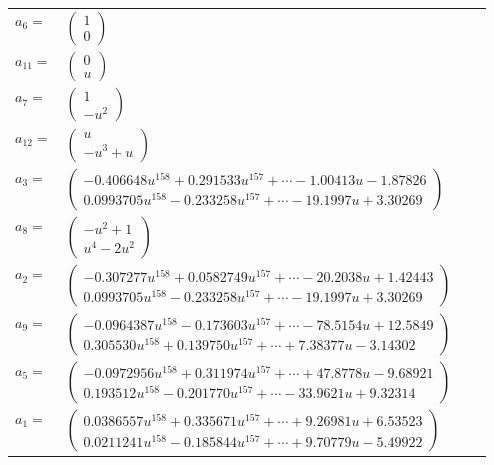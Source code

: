 \documentclass[1p]{elsarticle_modified}
\theoremstyle{definition}
\begin{document}
\begin{tabular}{m{7pt} m{180pt} m{7pt} m{180pt} }
\flushright $a_{6}=$&$\begin{pmatrix}1\\0\end{pmatrix}$ \\
\flushright $a_{11}=$&$\begin{pmatrix}0\\u\end{pmatrix}$ \\
\flushright $a_{7}=$&$\begin{pmatrix}1\\- u^2\end{pmatrix}$ \\
\flushright $a_{12}=$&$\begin{pmatrix}u\\- u^3+u\end{pmatrix}$ \\
\flushright $a_{3}=$&$\begin{pmatrix}-0.406648 u^{158}+0.291533 u^{157}+\cdots-1.00413 u-1.87826\\0.0993705 u^{158}-0.233258 u^{157}+\cdots-19.1997 u+3.30269\end{pmatrix}$ \\
\flushright $a_{8}=$&$\begin{pmatrix}- u^2+1\\u^4-2 u^2\end{pmatrix}$ \\
\flushright $a_{2}=$&$\begin{pmatrix}-0.307277 u^{158}+0.0582749 u^{157}+\cdots-20.2038 u+1.42443\\0.0993705 u^{158}-0.233258 u^{157}+\cdots-19.1997 u+3.30269\end{pmatrix}$ \\
\flushright $a_{9}=$&$\begin{pmatrix}-0.0964387 u^{158}-0.173603 u^{157}+\cdots-78.5154 u+12.5849\\0.305530 u^{158}+0.139750 u^{157}+\cdots+7.38377 u-3.14302\end{pmatrix}$ \\
\flushright $a_{5}=$&$\begin{pmatrix}-0.0972956 u^{158}+0.311974 u^{157}+\cdots+47.8778 u-9.68921\\0.193512 u^{158}-0.201770 u^{157}+\cdots-33.9621 u+9.32314\end{pmatrix}$ \\
\flushright $a_{1}=$&$\begin{pmatrix}0.0386557 u^{158}+0.335671 u^{157}+\cdots+9.26981 u+6.53523\\0.0211241 u^{158}-0.185844 u^{157}+\cdots+9.70779 u-5.49922\end{pmatrix}$ \\

\end{tabular}
\end{document}
